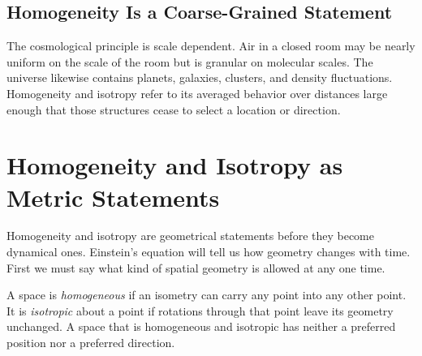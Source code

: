 \subsection{Homogeneity Is a Coarse-Grained Statement}

The cosmological principle is scale dependent. Air in a closed room may be nearly uniform on the scale of the room but is granular on molecular scales. The universe likewise contains planets, galaxies, clusters, and density fluctuations. Homogeneity and isotropy refer to its averaged behavior over distances large enough that those structures cease to select a location or direction.

\begin{classroomqa}
\end{classroomqa}

\section{Homogeneity and Isotropy as Metric Statements}

Homogeneity and isotropy are geometrical statements before they become dynamical ones. Einstein's equation will tell us how geometry changes with time. First we must say what kind of spatial geometry is allowed at any one time.

\begin{classroomqa}
\end{classroomqa}

\begin{definition}
A space is \emph{homogeneous} if an isometry can carry any point into any other point. It is \emph{isotropic} about a point if rotations through that point leave its geometry unchanged. A space that is homogeneous and isotropic has neither a preferred position nor a preferred direction.
\end{definition}

